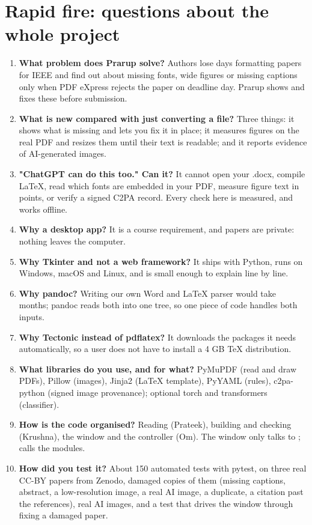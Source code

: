 \chapter{Rapid fire: questions about the whole project}

\color{ink}\begin{enumerate}[leftmargin=2em, itemsep=0.5em]
\item \textbf{What problem does Prarup solve?} Authors lose days formatting papers for IEEE and find out about missing fonts, wide figures or missing captions only when PDF eXpress rejects the paper on deadline day. Prarup shows and fixes these before submission.
\item \textbf{What is new compared with just converting a file?} Three things: it shows what is missing and lets you fix it in place; it measures figures on the real PDF and resizes them until their text is readable; and it reports evidence of AI-generated images.
\item \textbf{"ChatGPT can do this too." Can it?} It cannot open your .docx, compile LaTeX, read which fonts are embedded in your PDF, measure figure text in points, or verify a signed C2PA record. Every check here is measured, and works offline.
\item \textbf{Why a desktop app?} It is a course requirement, and papers are private: nothing leaves the computer.
\item \textbf{Why Tkinter and not a web framework?} It ships with Python, runs on Windows, macOS and Linux, and is small enough to explain line by line.
\item \textbf{Why pandoc?} Writing our own Word and LaTeX parser would take months; pandoc reads both into one tree, so one piece of code handles both inputs.
\item \textbf{Why Tectonic instead of pdflatex?} It downloads the packages it needs automatically, so a user does not have to install a 4 GB TeX distribution.
\item \textbf{What libraries do you use, and for what?} PyMuPDF (read and draw PDFs), Pillow (images), Jinja2 (LaTeX template), PyYAML (rules), c2pa-python (signed image provenance); optional torch and transformers (classifier).
\item \textbf{How is the code organised?} Reading (Prateek), building and checking (Krushna), the window and the controller (Om). The window only talks to ;  calls the modules.
\item \textbf{How did you test it?} About 150 automated tests with pytest, on three real CC-BY papers from Zenodo, damaged copies of them (missing captions, abstract, a low-resolution image, a real AI image, a duplicate, a citation past the references), real AI images, and a test that drives the window through fixing a damaged paper.

\end{enumerate}
